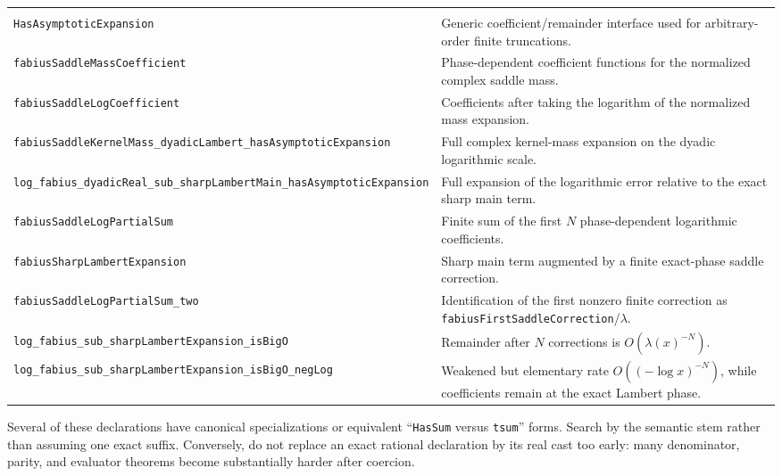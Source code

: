 \documentclass[11pt,a4paper,openany]{book}
\newcommand{\pathbreak}[1]{\nolinkurl{#1}}
\begin{document}
\begin{longtable}{@{}>{\raggedright\arraybackslash}p{}p{}@{}}
\multicolumn{2}{@{}l}{\sffamily\bfseries\color{OliveDark} All-orders saddle expansion} \\
\addlinespace[.45em]
\pathbreak{HasAsymptoticExpansion} & Generic coefficient/remainder interface used for arbitrary-order finite truncations. \\
\addlinespace[.28em]
\pathbreak{fabiusSaddleMassCoefficient} & Phase-dependent coefficient functions for the normalized complex saddle mass. \\
\addlinespace[.28em]
\pathbreak{fabiusSaddleLogCoefficient} & Coefficients after taking the logarithm of the normalized mass expansion. \\
\addlinespace[.28em]
\pathbreak{fabiusSaddleKernelMass_dyadicLambert_hasAsymptoticExpansion} & Full complex kernel-mass expansion on the dyadic logarithmic scale. \\
\addlinespace[.28em]
\pathbreak{log_fabius_dyadicReal_sub_sharpLambertMain_hasAsymptoticExpansion} & Full expansion of the logarithmic error relative to the exact sharp main term. \\
\addlinespace[.28em]
\pathbreak{fabiusSaddleLogPartialSum} & Finite sum of the first $N$ phase-dependent logarithmic coefficients. \\
\addlinespace[.28em]
\pathbreak{fabiusSharpLambertExpansion} & Sharp main term augmented by a finite exact-phase saddle correction. \\
\addlinespace[.28em]
\pathbreak{fabiusSaddleLogPartialSum_two} & Identification of the first nonzero finite correction as \pathbreak{fabiusFirstSaddleCorrection}/$\lambda$. \\
\addlinespace[.28em]
\pathbreak{log_fabius_sub_sharpLambertExpansion_isBigO} & Remainder after $N$ corrections is $O(\lambda(x)^{-N})$. \\
\addlinespace[.28em]
\pathbreak{log_fabius_sub_sharpLambertExpansion_isBigO_negLog} & Weakened but elementary rate $O((-\log x)^{-N})$, while coefficients remain at the exact Lambert phase. \\
\end{longtable}

\begin{engineering}
Several of these declarations have canonical specializations or equivalent
``\pathbreak{HasSum} versus \pathbreak{tsum}'' forms.  Search by the semantic
stem rather than assuming one exact suffix.  Conversely, do not replace an
exact rational declaration by its real cast too early: many denominator,
parity, and evaluator theorems become substantially harder after coercion.
\end{engineering}
\end{document}
